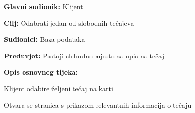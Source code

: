 					\noindent {}
					\begin{packed_item}
	
						\item \textbf{Glavni sudionik: }Klijent
						\item  \textbf{Cilj:} Odabrati jedan od slobodnih tečajeva
						\item  \textbf{Sudionici:} Baza podataka
						\item  \textbf{Preduvjet:} Postoji slobodno mjesto za upis na tečaj
						\item  \textbf{Opis osnovnog tijeka:						
						}
						
						\item[] \begin{packed_enum}
	
							\item Klijent odabire željeni tečaj na karti
							\item Otvara se stranica s prikazom relevantnih informacija o tečaju
						\end{packed_enum}
					\end{packed_item}
				

